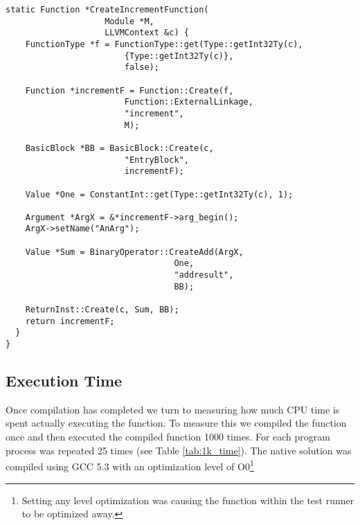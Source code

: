 \begin{lstlisting}[float,floatplacement=H,
  caption={Generating MCJIT IR for the increment program.},
  label=lst:llvm_increment]
  static Function *CreateIncrementFunction(
                    Module *M, 
                    LLVMContext &c) {
    FunctionType *f = FunctionType::get(Type::getInt32Ty(c), 
                        {Type::getInt32Ty(c)}, 
                        false);
    
    Function *incrementF = Function::Create(f, 
                        Function::ExternalLinkage, 
                        "increment", 
                        M);

    BasicBlock *BB = BasicBlock::Create(c, 
                        "EntryBlock", 
                        incrementF);
    
    Value *One = ConstantInt::get(Type::getInt32Ty(c), 1);
    
    Argument *ArgX = &*incrementF->arg_begin(); 
    ArgX->setName("AnArg");
  
    Value *Sum = BinaryOperator::CreateAdd(ArgX, 
                                  One,
                                  "addresult", 
                                  BB);
  
    ReturnInst::Create(c, Sum, BB);
    return incrementF;
  }
}\end{lstlisting}

\subsection{Execution Time}
Once compilation has completed we turn to measuring how much CPU time is spent actually executing the function.
To measure this we compiled the function once and then executed the compiled function 1000 times.
For each program process was repeated 25 times (see Table \ref{tab:1k_time}).
The native solution was compiled using GCC 5.3 with an optimization level of O0\footnote{
  Setting any level optimization was causing the function within the test runner to be optimized away.
}

